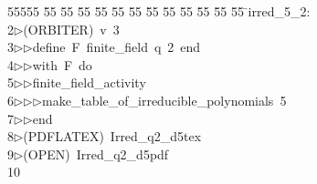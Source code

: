 %
%
\begin{tabbing}
55555 \= 55 \= 55 \= 55 \= 55 \= 55 \= 55 \= 55 \= 55 \= 55 \= 55 \= 55 \= 55 \= \>irred\_5\_2:\\[0pt]
2\>$\triangleright$\>(ORBITER)\ v\ 3\ \\[0pt]
3\>$\triangleright$\>$\triangleright$\>define\ F\ finite\_field\ q\ 2\ end\ \\[0pt]
4\>$\triangleright$\>$\triangleright$\>with\ F\ do\ \\[0pt]
5\>$\triangleright$\>$\triangleright$\>finite\_field\_activity\ \\[0pt]
6\>$\triangleright$\>$\triangleright$\>$\triangleright$\>make\_table\_of\_irreducible\_polynomials\ 5\ \\[0pt]
7\>$\triangleright$\>$\triangleright$\>end\\[0pt]
8\>$\triangleright$\>(PDFLATEX)\ Irred\_q2\_d5tex\\[0pt]
9\>$\triangleright$\>(OPEN)\ Irred\_q2\_d5pdf\\[0pt]
10\>\end{tabbing}

